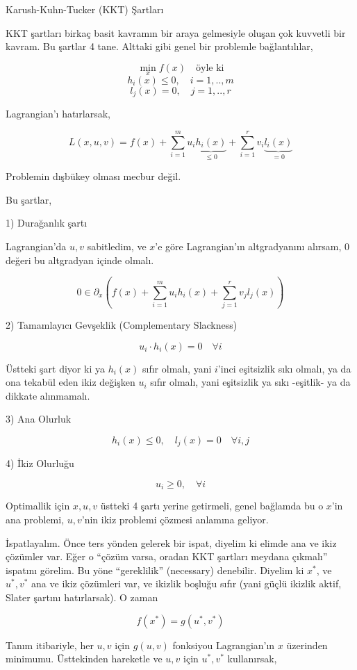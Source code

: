 \documentclass[12pt,fleqn]{article}\usepackage{../../common}
\begin{document}
Karush-Kuhn-Tucker (KKT) Şartları

KKT şartları birkaç basit kavramın bir araya gelmesiyle oluşan çok kuvvetli
bir kavram. Bu şartlar 4 tane. Alttaki gibi genel bir problemle bağlantılılar,

$$
\min_x f(x) \quad \textrm{öyle ki}
$$
$$
h_i(x) \le 0, \quad i=1,..,m
$$
$$
l_j(x) = 0, \quad j=1,..,r
$$

Lagrangian'ı hatırlarsak, 

$$
L(x,u,v) =  f(x) + 
\sum_{i=1}^{m} u_i \underbrace{h_i(x)}_{\le 0} + 
\sum_{i=1}^{r} v_i \underbrace{l_i(x)}_{=0}
$$

Problemin dışbükey olması mecbur değil. 

Bu şartlar,

1) Durağanlık şartı

Lagrangian'da $u,v$ sabitledim, ve $x$'e göre Lagrangian'ın altgradyanını
alırsam, 0 değeri bu altgradyan içinde olmalı. 

$$
0 \in \partial_x \left(
f(x) + \sum_{i=1}^{m} u_i h_i(x) + \sum_{j=1}^{r} v_j l_j(x) 
\right)
$$

2) Tamamlayıcı Gevşeklik (Complementary Slackness)

$$
u_i \cdot h_i(x) = 0 \quad \forall i
$$

Üstteki şart diyor ki ya $h_i(x)$ sıfır olmalı, yani $i$'inci eşitsizlik
sıkı olmalı, ya da ona tekabül eden ikiz değişken $u_i$ sıfır olmalı, yani
eşitsizlik ya sıkı -eşitlik- ya da dikkate alınmamalı.

3) Ana Olurluk

$$
h_i(x) \le 0, \quad l_j(x) = 0 \quad \forall i,j
$$

4) İkiz Olurluğu

$$
u_i \ge 0, \quad \forall i
$$

Optimallik için $x,u,v$ üstteki 4 şartı yerine getirmeli, genel bağlamda bu
o $x$'in ana problemi, $u,v$'nin ikiz problemi çözmesi anlamına geliyor. 

İspatlayalım. Önce ters yönden gelerek bir ispat, diyelim ki elimde ana ve
ikiz çözümler var. Eğer o ``çözüm varsa, oradan KKT şartları meydana
çıkmalı'' ispatını görelim. Bu yöne ``gereklilik'' (necessary)
denebilir. Diyelim ki $x^*$, ve $u^*,v^*$ ana ve ikiz çözümleri var, ve
ikizlik boşluğu sıfır (yani güçlü ikizlik aktif, Slater şartını
hatırlarsak). O zaman

$$
f(x^*) = g(u^*,v^*)
$$

Tanım itibariyle, her $u,v$ için $g(u,v)$ fonksiyou Lagrangian'ın $x$
üzerinden minimumu. Üsttekinden hareketle ve $u,v$ için $u^*,v^*$
kullanırsak,
\end{document}
